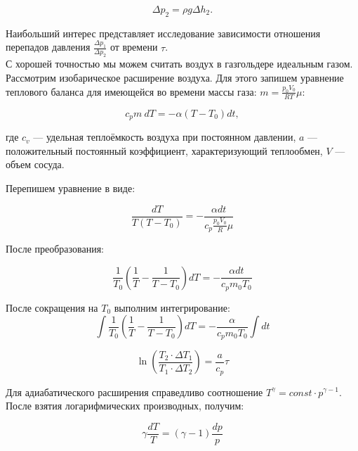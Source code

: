 \documentclass[a4paper,12pt]{article}
\begin{document}
\begin{equation}
    \Delta p_2 = \rho g \Delta h_2.
\end{equation}

Наибольший интерес представляет исследование зависимости отношения перепадов давления $\frac{\Delta p_1}{\Delta p_2}$ от времени $\tau$. \\



С хорошей точностью мы можем считать воздух в газгольдере идеальным газом. Рассмотрим изобарическое расширение воздуха. Для этого запишем уравнение теплового баланса для имеющейся во времени массы газа: $m = \frac{p_0V_0}{RT}\mu$:

\begin{equation}
    c_p m \ dT = -\alpha (T - T_0) dt, 
\end{equation}

где $c_v$ — удельная теплоёмкость воздуха при постоянном давлении, $a$ — положительный постоянный коэффициент, характеризующий теплообмен, $V$ — объем сосуда.

Перепишем уравнение в виде:

\begin{equation}
    \frac{dT}{T(T - T_0)} = -\frac{\alpha dt}{c_p \frac{p_0V_0}{R}\mu} 
\end{equation}

После преобразования:

\begin{equation}
    \frac{1}{T_0} \left(\frac{1}{T} -\frac{1}{T - T_0} \right)dT = -\frac{\alpha dt}{c_p m_0T_0} 
\end{equation}

После сокращения на $T_0 $ выполним интегрирование:
\begin{equation}
    \int \frac{1}{T_0} \left(\frac{1}{T} -\frac{1}{T - T_0} \right)dT = -\frac{\alpha}{c_p m_0T_0} \int dt
\end{equation}

\begin{equation}
    \ln \left( \frac{T_2 \cdot \Delta T_1}{T_1 \cdot \Delta T_2} \right) =  \frac{a}{c_p} \tau
\end{equation}

Для адиабатического расширения справедливо соотношение $T^{\gamma} = const \cdot p^{\gamma-1}$. После взятия логарифмических производных, получим:

\begin{equation}
    \gamma \frac{dT}{T} = (\gamma - 1) \frac{dp}{p}
\end{equation}
\end{document}
